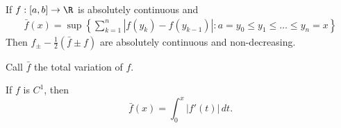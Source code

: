 \begin{lemma}
	If $f : [a,b] \to \R$ is absolutely continuous and
	\begin{align*}
		\bar{f} (x) = \sup \left\{ \sum_{k=1}^{n} | f (y_k) - f (y_{k-1}) | : a = y_0 \leq y_1 \leq \ldots \leq y_n = x \right\}
	\end{align*}
	Then $f_{\pm} - \frac{1}{2} (\bar{f} \pm f)$ are absolutely continuous and non-decreasing.
\end{lemma}

\begin{notation}
	Call $\bar{f}$ the total variation of $f$.
\end{notation}

\begin{example}
	If $f$ is $C^1$, then
	\[
  	\bar{f}(x) = \int_0^x |f'(t)| \, dt.
	\]
\end{example}


